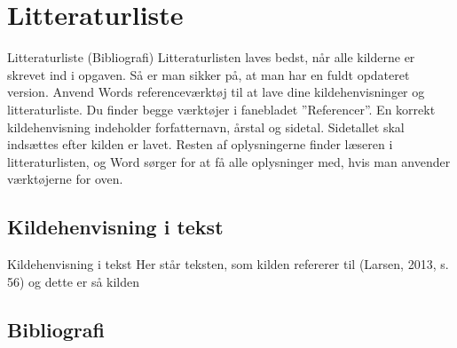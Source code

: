 \section{Litteraturliste}
Litteraturliste (Bibliografi) Litteraturlisten laves bedst, når alle kilderne er
skrevet ind i opgaven. Så er man sikker på, at man har en fuldt opdateret
version. Anvend Words referenceværktøj til at lave dine kildehenvisninger og
litteraturliste. Du finder begge værktøjer i fanebladet ”Referencer”.
En korrekt kildehenvisning indeholder forfatternavn, årstal og sidetal.
Sidetallet skal indsættes efter kilden er lavet. Resten af oplysningerne finder
læseren i litteraturlisten, og Word sørger for at få alle oplysninger med, hvis
man anvender værktøjerne for oven.
\subsection{Kildehenvisning i tekst}
Kildehenvisning i tekst Her står teksten, som kilden refererer til (Larsen,
2013, s. 56) og dette er så kilden
\subsection{Bibliografi}

